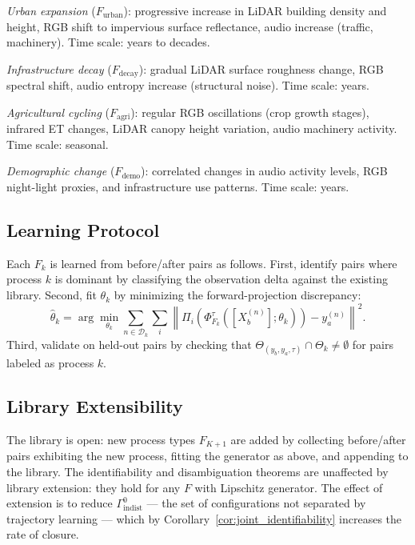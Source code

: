 \documentclass[12pt, oneside]{article}
\begin{document}
\emph{Urban expansion} ($F_{\mathrm{urban}}$): progressive increase in LiDAR building
density and height, RGB shift to impervious surface reflectance, audio increase (traffic,
machinery). Time scale: years to decades.

\emph{Infrastructure decay} ($F_{\mathrm{decay}}$): gradual LiDAR surface roughness
change, RGB spectral shift, audio entropy increase (structural noise). Time scale: years.

\emph{Agricultural cycling} ($F_{\mathrm{agri}}$): regular RGB oscillations (crop growth
stages), infrared ET changes, LiDAR canopy height variation, audio machinery activity.
Time scale: seasonal.

\emph{Demographic change} ($F_{\mathrm{demo}}$): correlated changes in audio activity
levels, RGB night-light proxies, and infrastructure use patterns. Time scale: years.

\subsection{Learning Protocol}

Each $F_k$ is learned from before/after pairs as follows. First, identify pairs where
process $k$ is dominant by classifying the observation delta against the existing library.
Second, fit $\theta_k$ by minimizing the forward-projection discrepancy:
\[
\hat{\theta}_k = \arg\min_{\theta_k} \sum_{n \in \mathcal{D}_k} \sum_i
\left\|\Pi_i(\Phi^\tau_{F_k}([X_b^{(n)}];\theta_k)) - y_a^{(n)}\right\|^2.
\]
Third, validate on held-out pairs by checking that
$\Theta_{(y_b,y_a,\tau)} \cap \Theta_k \ne \emptyset$ for pairs labeled as process $k$.

\subsection{Library Extensibility}

The library is open: new process types $F_{K+1}$ are added by collecting before/after
pairs exhibiting the new process, fitting the generator as above, and appending to the
library. The identifiability and disambiguation theorems are unaffected by library
extension: they hold for any $F$ with Lipschitz generator. The effect of extension is to
reduce $\Gamma^0_{\mathrm{indist}}$ --- the set of configurations not separated by
trajectory learning --- which by Corollary~\ref{cor:joint_identifiability} increases the
rate of closure.

\end{document}
